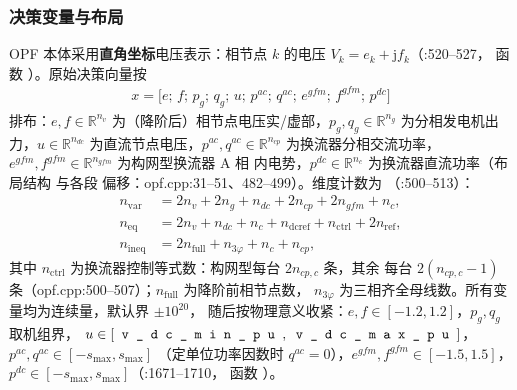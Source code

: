 \subsubsection*{决策变量与布局}
OPF 本体采用\textbf{直角坐标}电压表示：相节点 $k$ 的电压
$V_k=e_k+\mathrm{j}f_k$（:520--527，
函数 ）。原始决策向量按
\begin{align*}
x=\bigl[e;\,f;\,p_g;\,q_g;\,u;\,p^{ac};\,q^{ac};\,e^{gfm};\,f^{gfm};\,p^{dc}\bigr]
\end{align*}
排布：$e,f\in\mathbb{R}^{n_v}$ 为（降阶后）相节点电压实/虚部，$p_g,q_g\in\mathbb{R}^{n_g}$
为分相发电机出力，$u\in\mathbb{R}^{n_{dc}}$ 为直流节点电压，$p^{ac},q^{ac}\in\mathbb{R}^{n_{cp}}$
为换流器分相交流功率，$e^{gfm},f^{gfm}\in\mathbb{R}^{n_{gfm}}$ 为构网型换流器 A 相
内电势，$p^{dc}\in\mathbb{R}^{n_c}$ 为换流器直流功率（布局结构  与各段
偏移：opf.cpp:31--51、482--499）。维度计数为
（:500--513）：
\begin{align*}
n_{\mathrm{var}} &= 2n_v+2n_g+n_{dc}+2n_{cp}+2n_{gfm}+n_c,\\
n_{\mathrm{eq}} &= 2n_v+n_{dc}+n_c+n_{\mathrm{dcref}}+n_{\mathrm{ctrl}}+2n_{\mathrm{ref}},\\
n_{\mathrm{ineq}} &= 2n_{\mathrm{full}}+n_{3\varphi}+n_c+n_{cp},
\end{align*}
其中 $n_{\mathrm{ctrl}}$ 为换流器控制等式数：构网型每台 $2n_{cp,c}$ 条，其余
每台 $2(n_{cp,c}-1)$ 条（opf.cpp:500--507）；$n_{\mathrm{full}}$ 为降阶前相节点数，
$n_{3\varphi}$ 为三相齐全母线数。所有变量均为连续量，默认界 $\pm10^{20}$，
随后按物理意义收紧：$e,f\in[-1.2,1.2]$，$p_g,q_g$ 取机组界，
$u\in[\fld{v\_dc\_min\_pu},\fld{v\_dc\_max\_pu}]$，$p^{ac},q^{ac}\in[-s_{\max},s_{\max}]$
（定单位功率因数时 $q^{ac}=0$），$e^{gfm},f^{gfm}\in[-1.5,1.5]$，
$p^{dc}\in[-s_{\max},s_{\max}]$（:1671--1710，
函数 ）。


